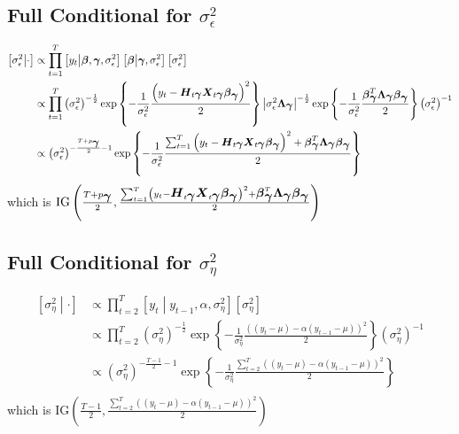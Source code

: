 \documentclass[fleqn]{article}
\def\bm#1{\mbox{\boldmath $#1$}}
\begin{document}
\subsection{Full Conditional for $\sigma^2_\epsilon$}
%
\begin{align*}
%
\left[ \sigma^2_\epsilon \middle| \cdot \right] & \propto \prod_{t = 1}^T \left[ y_t \middle| \bm{\beta}, \bm{\gamma}, \sigma^2_\epsilon \right] \left[ \bm{\beta} \middle| \bm{\gamma}, \sigma^2_\epsilon \right] \left[ \sigma^2_\epsilon \right] \\
%
 & \propto \prod_{t = 1}^T \left( \sigma^2_\epsilon \right)^{ - \frac{1} {2}} \exp{ \left \{ - \frac{1} {\sigma^2_\epsilon} \frac{ \left( y_t - \bm{H}_{t \bm{\gamma}} \bm{X}_{t \bm{\gamma}} \bm{\beta}_{\bm{\gamma}} \right)^2 } {2} \right\} } \left| \sigma^2_\epsilon \bm{\Lambda}_{\bm{\gamma}} \right|^{ - \frac{1} {2}} \exp{ \left\{ - \frac{1} {\sigma^2_\epsilon} \frac{\bm{\beta}_{\bm{\gamma}}^T \bm{\Lambda}_{\bm{\gamma}} \bm{\beta}_{\bm{\gamma}}} {2} \right\} } \left( \sigma^2_\epsilon \right)^{ - 1}\\
%
 & \propto \left( \sigma^2_\epsilon \right)^{ - \frac{T + p_{\bm{\gamma}}} {2} - 1} \exp{\left\{ - \frac{1} {\sigma^2_\epsilon} \frac{ \sum_{t = 1}^T \left( y_t - \bm{H}_{t \bm{\gamma}} \bm{X}_{t \bm{\gamma}} \bm{\beta}_{\bm{\gamma}} \right)^2 + \bm{\beta}_{\bm{\gamma}}^T \bm{\Lambda}_{\bm{\gamma}} \bm{\beta}_{\bm{\gamma}} } {2} \right\} } 
%
\end{align*}
%
which is $\mbox{IG} \left( \frac{T + p_{\bm{\gamma}}} {2}, \frac{\sum_{t = 1}^T \left( y_t - \bm{H}_{t \bm{\gamma}} \bm{X}_{t \bm{\gamma}} \bm{\beta}_{\bm{\gamma}} \right)^2 + \bm{\beta}_{\bm{\gamma}}^T \bm{\Lambda}_{\bm{\gamma}} \bm{\beta}_{\bm{\gamma}}} {2} \right)$
\subsection{Full Conditional for $\sigma^2_\eta$}
%
\begin{align*}
%
\left[ \sigma^2_\eta \middle| \cdot \right] & \propto \prod_{t = 2}^T \left[ y_t \middle| y_{t - 1}, \alpha, \sigma^2_\eta \right] \left[ \sigma^2_\eta \right] \\
%
 & \propto \prod_{t = 2}^T \left( \sigma^2_\eta \right)^{ - \frac{1} {2}} \exp{\left\{ - \frac{1} {\sigma^2_\eta} \frac{ \left( \left(y_t - \mu \right) - \alpha \left( y_{t - 1} - \mu \right) \right)^2} {2} \right\} } \left( \sigma^2_\eta \right)^{ - 1}\\
%
 & \propto \left( \sigma^2_\eta \right)^{ - \frac{T - 1} {2} - 1} \exp{\left\{ - \frac{1} {\sigma^2_\eta} \frac{ \sum_{t = 2}^T \left( \left(y_t - \mu \right) - \alpha \left( y_{t - 1} - \mu \right) \right)^2} {2} \right\} } \\
%
\end{align*}
%
which is $\mbox{IG} \left( \frac{T - 1} {2}, 
\frac{ \sum_{t = 2}^T \left( \left(y_t - \mu \right) - \alpha \left( y_{t - 1} - \mu \right) \right)^2} {2} \right)$
\end{document}
